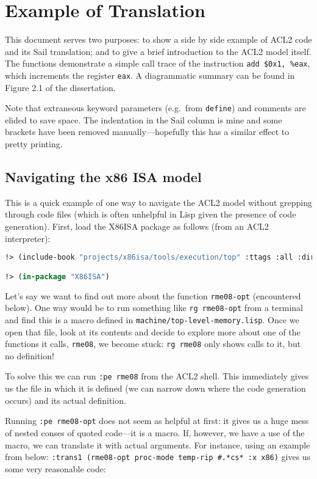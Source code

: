 \documentclass[a4paper]{article}
\begin{document}
\section{Example of Translation}

This document serves two purposes: to show a side by side example of ACL2 code and its Sail translation; and to give a brief introduction to the ACL2 model itself.  The functions demonstrate a simple call trace of the instruction \texttt{add \$0x1, \%eax}, which increments the register \texttt{eax}.  A diagrammatic summary can be found in Figure 2.1 of the dissertation.

Note that extraneous keyword parameters (e.g.~from \texttt{define}) and comments are elided to save space.  The indentation in the Sail column is mine and some brackets have been removed manually---hopefully this has a similar effect to pretty printing.

\subsection{Navigating the x86 ISA model}

This is a quick example of one way to navigate the ACL2 model without grepping through code files (which is often unhelpful in Lisp given the presence of code generation).  First, load the X86ISA package as follows (from an ACL2 interpreter):

\begin{lstlisting}[language=lisp]
!> (include-book "projects/x86isa/tools/execution/top" :ttags :all :dir :system)  

!> (in-package "X86ISA")

\end{lstlisting}

Let's say we want to find out more about the function \texttt{rme08-opt} (encountered below).  One way would be to run something like \texttt{rg rme08-opt} from a terminal and find this is a macro defined in \texttt{machine/top-level-memory.lisp}.  Once we open that file, look at its contents and decide to explore more about one of the functions it calls, \texttt{rme08}, we become stuck: \texttt{rg rme08} only shows calls to it, but no definition!

To solve this we can run \texttt{:pe rme08} from the ACL2 shell.  This immediately gives us the file in which it is defined (we can narrow down where the code generation occurs) and its actual definition.

Running \texttt{:pe rme08-opt} does not seem as helpful at first: it gives us a huge mess of nested conses of quoted code---it is a macro.  If, however, we have a use of the macro, we can translate it with actual arguments.  For instance, using an example from below: \texttt{:trans1 (rme08-opt proc-mode temp-rip \#.*cs* :x x86)} gives us some very reasonable code:
\end{document}
